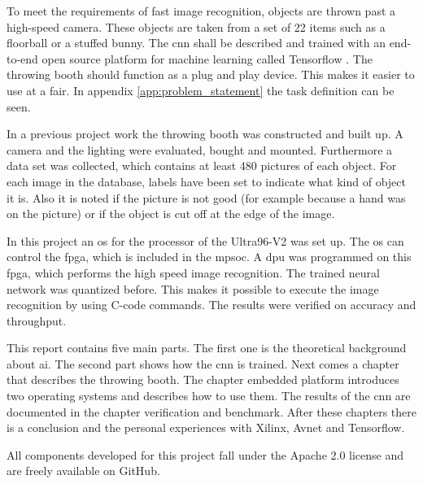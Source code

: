 To meet the requirements of fast image recognition, objects are thrown past a high-speed camera.
These objects are taken from a set of 22 items such as a floorball or a stuffed bunny.
The \acrshort{cnn} shall be described and trained with an end-to-end open source platform for machine learning called Tensorflow \cite{tensorflow_main}.
The throwing booth should function as a plug and play device.
This makes it easier to use at a fair.
In appendix \ref{app:problem_statement} the task definition can be seen.

In a previous project work the throwing booth was constructed and built up.
A camera and the lighting were evaluated, bought and mounted.
Furthermore a data set was collected, which contains at least 480 pictures of each object. 
For each image in the database, labels have been set to indicate what kind of object it is.
Also it is noted if the picture is not good (for example because a hand was on the picture) or if the object is cut off at the edge  of the image.

In this project an \acrfull{os} for the processor of the Ultra96-V2 was set up.
The \acrshort{os} can control the \acrfull{fpga}, which is included in the \acrfull{mpsoc}.
A \acrfull{dpu} was programmed on this \acrshort{fpga}, which performs the high speed image recognition.
The trained neural network was quantized before.
This makes it possible to execute the image recognition by using C-code commands.
The results were verified on accuracy and throughput.

This report contains five main parts.
The first one is the theoretical background about \acrfull{ai}.
The second part shows how the \acrlong{cnn} is trained.
Next comes a chapter that describes the throwing booth.
The chapter embedded platform introduces two operating systems and describes how to use them.
The results of the \acrshort{cnn} are documented in the chapter verification and benchmark.
After these chapters there is a conclusion and the personal experiences with Xilinx, Avnet and Tensorflow.

All components developed for this project fall under the Apache 2.0 license and are freely available on GitHub.
